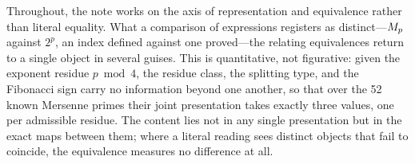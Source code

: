 \medskip
Throughout, the note works on the axis of representation and equivalence
rather than literal equality.  What a comparison of expressions registers as
distinct---$M_{p}$ against $2^{p}$, an index defined against one proved---the
relating equivalences return to a single object in several guises.  This is
quantitative, not figurative: given the exponent residue $p\bmod4$, the
residue class, the splitting type, and the Fibonacci sign carry no
information beyond one another, so that over the 52 known Mersenne primes
their joint presentation takes exactly three values, one per admissible
residue.  The content lies not in any single presentation but in the exact
maps between them; where a literal reading sees distinct objects that fail to
coincide, the equivalence measures no difference at all.

